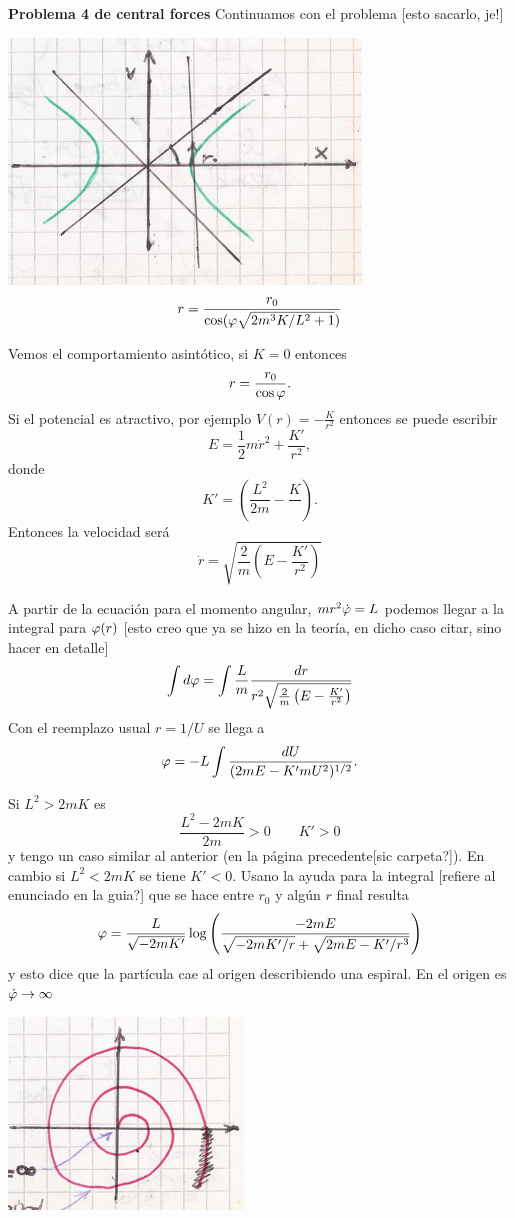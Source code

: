 \documentclass[10pt,oneside]{CBFT_book}
\begin{document}
\begin{ejemplo}{\bf Problema 4 de central forces}
Continuamos con el problema [esto sacarlo, je!]

\includegraphics[scale=0.3]{images/fig_mc_potencial_central_5_orbitas.jpg}
\[
	r = \frac{ r_0 }{ \cos( \varphi \sqrt{ 2 m^3 K / L^2 + 1 } ) }
\]

Vemos el comportamiento asintótico, si $ K = 0 $ entonces
\[
	r = \frac{ r_0 }{ \cos \varphi }.
\]
Si el potencial es atractivo, por ejemplo $ V(r) = -\frac{K}{r^2}$ entonces se puede escribir 
\[
	E = \frac{1}{2} m \dot{r}^2 + \frac{K'}{r^2},
\]
donde 
\[
	K' = \left( \frac{L^2}{2m} - \frac{K}{} \right).
\]
Entonces la velocidad será 
\[
	\dot{r} = \sqrt{ \frac{2}{m}\left( E - \frac{K'}{r^2} \right) }
\]

A partir de la ecuación para el momento angular, $ m r^2 \dot{\varphi} = L $ podemos llegar a la integral para $\varphi(r)$ [esto creo que ya se hizo en la 
teoría, en dicho caso citar, sino hacer en detalle]
\[
	\int d\varphi = \int \frac{L}{m} \frac{ dr }{ r^2 \sqrt{ \frac{2}{m}\left( E - \frac{K'}{r^2} \right) }}
\]
Con el reemplazo usual $r = 1/U$ se llega a 
\[
	\varphi = -L \int \frac{ dU }{ ( 2mE - K'mU^2 )^{1/2}}.
\]

Si $L^2 > 2mK$ es 
\[
	\frac{L^2 - 2mK}{2m} > 0 \qquad K'>0
\]
y tengo un caso similar al anterior (en la página precedente[sic carpeta?]). En cambio si $ L^2 < 2mK $ se tiene $ K' < 0 $.
Usano la ayuda para la integral [refiere al enunciado en la guia?] que se hace entre $r_0$ y algún $r$ final resulta 
\[
	\varphi =  \frac{L}{\sqrt{-2mK'}} \log \left( \frac{-2mE}{ \sqrt{ -2mK'/r } + \sqrt{2mE - K'/r^3} }\right)
\]
y esto dice que la partícula cae al origen describiendo una espiral. En el origen es $\dot{\varphi} \to \infty$

\includegraphics[scale=0.3]{images/fig_mc_potencial_central_6_orbitas.jpg}


\end{ejemplo}
\end{document}
